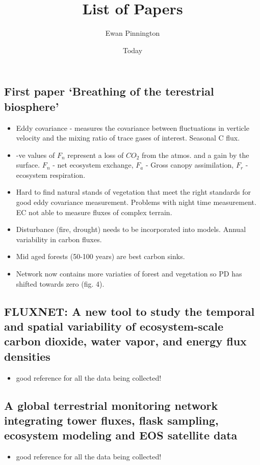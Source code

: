 \documentclass[11pt]{article}
\title{List of Papers}
\author{Ewan Pinnington}
\date{Today}
\begin{document}
\maketitle

\subsection*{First paper `Breathing of the terestrial biosphere' \cite{baldocchi2008turner}}
\noindent
\begin{itemize}
\item Eddy covariance - measures the covariance between fluctuations in verticle velocity and the mixing ratio of trace gases of interest. Seasonal C flux.
\item -ve values of $F_{n}$ represent a loss of $CO_{2}$ from the atmos. and a gain by the surface. $F_{n}$ - net ecosystem exchange, $F_{a}$ - Gross canopy assimilation, $F_{r}$ - ecosystem respiration.
\item Hard to find natural stands of vegetation that meet the right standards for good eddy covariance measurement. Problems with night time measurement. EC not able to measure fluxes of complex terrain.
\item Disturbance (fire, drought) needs to be incorporated into models. Annual variability in carbon fluxes. 
\item Mid aged forests (50-100 years) are best carbon sinks.
\item Network now contains more variaties of forest and vegetation so PD has shifted towards zero (fig. 4).
\end{itemize}


\subsection*{FLUXNET: A new tool to study the temporal and spatial variability of ecosystem-scale carbon dioxide, water vapor, and energy flux densities \cite{baldocchi2001fluxnet}}
\noindent
\begin{itemize}
\item good reference for all the data being collected!
\end{itemize}


\subsection*{A global terrestrial monitoring network integrating tower fluxes, flask sampling, ecosystem modeling and EOS satellite data \cite{running1999global}}
\noindent
\begin{itemize}
\item good reference for all the data being collected!
\end{itemize}
\end{document}

